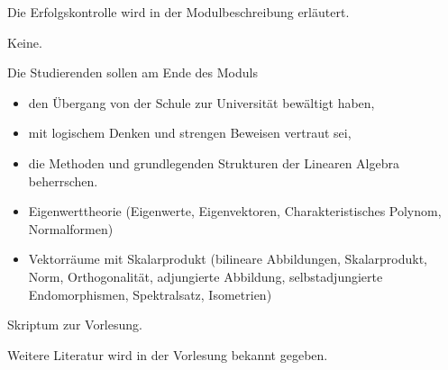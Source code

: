 \begin{course}

\setdoclanguagegerman
{}



\coursehead


\label{cour_6281.dp_997}


\begin{styleenv}
\begin{assessment}
Die Erfolgskontrolle wird in der Modulbeschreibung erläutert.


\end{assessment}

\begin{conditions}Keine.\end{conditions}


\end{styleenv}

\begin{learningoutcomes}
Die Studierenden sollen am Ende des Moduls

 \begin{itemize}\item den Übergang von der Schule zur Universität bewältigt haben,  \item mit logischem Denken und strengen Beweisen vertraut sei,   \item die Methoden und grundlegenden Strukturen der Linearen Algebra beherrschen.  \end{itemize}
\end{learningoutcomes}

\begin{content}
\begin{itemize}\item Eigenwerttheorie (Eigenwerte, Eigenvektoren, Charakteristisches Polynom, Normalformen)   \item Vektorräume mit Skalarprodukt (bilineare Abbildungen, Skalarprodukt, Norm, Orthogonalität, adjungierte Abbildung, selbstadjungierte Endomorphismen, Spektralsatz, Isometrien)   \end{itemize}
\end{content}



\begin{literature}Skriptum zur Vorlesung.

 

Weitere Literatur wird in der Vorlesung bekannt gegeben.

\end{literature}



\end{course}